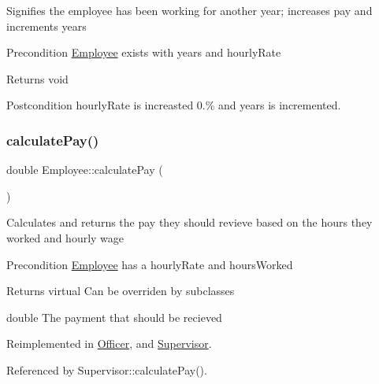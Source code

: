 Signifies the employee has been working for another year; increases pay and increments years

\begin{DoxyPrecond}{Precondition}
\hyperlink{classEmployee}{Employee} exists with years and hourly\+Rate 
\end{DoxyPrecond}
\begin{DoxyReturn}{Returns}
void 
\end{DoxyReturn}
\begin{DoxyPostcond}{Postcondition}
hourly\+Rate is increasted 0.\% and years is incremented. 
\end{DoxyPostcond}
\mbox{\label{classEmployee_a01c2c44e15434237db28832f6972e960}} 
\subsubsection{\texorpdfstring{calculate\+Pay()}{calculatePay()}}
{\footnotesize\ttfamily double Employee\+::calculate\+Pay (\begin{DoxyParamCaption}{ }\end{DoxyParamCaption})\hspace{0.3cm}{\ttfamily [virtual]}}

Calculates and returns the pay they should revieve based on the hours they worked and hourly wage

\begin{DoxyPrecond}{Precondition}
\hyperlink{classEmployee}{Employee} has a hourly\+Rate and hours\+Worked 
\end{DoxyPrecond}
\begin{DoxyReturn}{Returns}
virtual Can be overriden by subclasses 

double The payment that should be recieved 
\end{DoxyReturn}


Reimplemented in \hyperlink{classOfficer_a1fa1aad39b9e95be7a088990ebf17059}{Officer}, and \hyperlink{classSupervisor_aa37daa89523c08b84ae8141299e036f8}{Supervisor}.



Referenced by Supervisor\+::calculate\+Pay().

\mbox{\label{classEmployee_a79556ad700627dba88049f487a34a762}} 
